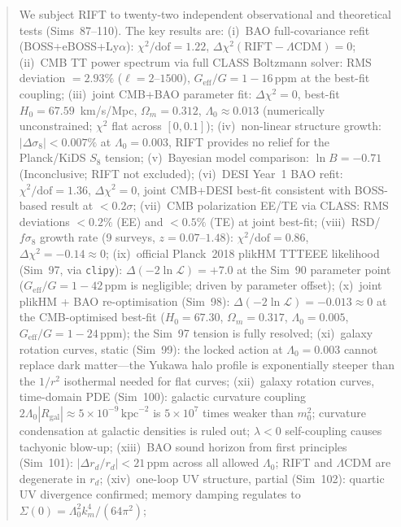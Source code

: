 \documentclass[12pt,a4paper]{article}
\begin{document}
\begin{abstract}
We subject RIFT to twenty-two independent observational and theoretical tests (Sims~87--110).
The key results are:
(i)~BAO full-covariance refit (BOSS+eBOSS+Ly$\alpha$):
    $\chi^2/\mathrm{dof}=1.22$, $\Delta\chi^2(\mathrm{RIFT}-\Lambda\mathrm{CDM})=0$;
(ii)~CMB TT power spectrum via full CLASS Boltzmann solver: RMS deviation $=2.93\%$
    ($\ell=2$--$1500$), $G_{\mathrm{eff}}/G = 1-16\,\mathrm{ppm}$ at the best-fit
    coupling;
(iii)~joint CMB+BAO parameter fit:
    $\Delta\chi^2=0$, best-fit $H_0=67.59$~km/s/Mpc, $\Omega_m=0.312$,
    $\Lambda_0\approx0.013$ (numerically unconstrained; $\chi^2$ flat across $[0,0.1]$);
(iv)~non-linear structure growth: $|\Delta\sigma_8|<0.007\%$ at $\Lambda_0=0.003$,
    RIFT provides no relief for the Planck/KiDS $S_8$ tension;
(v)~Bayesian model comparison: $\ln B = -0.71$ (Inconclusive; RIFT not excluded);
(vi)~DESI Year~1 BAO refit: $\chi^2/\mathrm{dof}=1.36$, $\Delta\chi^2=0$,
    joint CMB+DESI best-fit consistent with BOSS-based result at $<0.2\sigma$;
(vii)~CMB polarization EE/TE via CLASS: RMS deviations $<0.2\%$ (EE) and
    $<0.5\%$ (TE) at joint best-fit;
(viii)~RSD/$f\sigma_8$ growth rate (9 surveys, $z=0.07$--$1.48$):
    $\chi^2/\mathrm{dof}=0.86$, $\Delta\chi^2=-0.14\approx0$;
(ix)~official Planck~2018 plikHM TTTEEE likelihood (Sim~97, via \texttt{clipy}):
    $\Delta(-2\ln\mathcal{L})=+7.0$ at the Sim~90 parameter point
    ($G_\mathrm{eff}/G=1-42\,\mathrm{ppm}$ is negligible; driven by parameter offset);
(x)~joint plikHM + BAO re-optimisation (Sim~98): $\Delta(-2\ln\mathcal{L})=-0.013\approx 0$
    at the CMB-optimised best-fit ($H_0=67.30$, $\Omega_m=0.317$, $\Lambda_0=0.005$,
    $G_\mathrm{eff}/G=1-24\,\mathrm{ppm}$); the Sim~97 tension is fully resolved;
(xi)~galaxy rotation curves, static (Sim~99): the locked action at $\Lambda_0=0.003$
    cannot replace dark matter---the Yukawa halo profile is exponentially steeper
    than the $1/r^2$ isothermal needed for flat curves;
(xii)~galaxy rotation curves, time-domain PDE (Sim~100): galactic curvature coupling
    $2\Lambda_0|R_\mathrm{gal}|\approx5\times10^{-9}\,\mathrm{kpc}^{-2}$ is
    $5\times10^7$ times weaker than $m_0^2$; curvature condensation at galactic
    densities is ruled out; $\lambda<0$ self-coupling causes tachyonic blow-up;
(xiii)~BAO sound horizon from first principles (Sim~101): $|\Delta r_d/r_d|<21\,\mathrm{ppm}$
    across all allowed $\Lambda_0$; RIFT and $\Lambda$CDM are degenerate in $r_d$;
(xiv)~one-loop UV structure, partial (Sim~102): quartic UV divergence confirmed;
    memory damping regulates to $\Sigma(0)=\Lambda_0^2 k_m^4/(64\pi^2)$;

\end{abstract}
\end{document}
